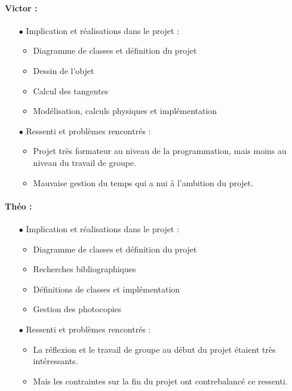 \paragraph{Victor :}
\begin{itemize}
\item[$\bullet$]  Implication et réalisations dans le projet :
\begin{itemize}
\item Diagramme de classes et définition du projet
\item Dessin de l'objet
\item Calcul des tangentes
\item Modélisation, calculs physiques et implémentation
\end{itemize}
\item[$\bullet$] Ressenti et problèmes rencontrés :
\begin{itemize}
\item Projet très formateur au niveau de la programmation, mais moins au niveau du travail de groupe.
\item Mauvaise gestion du temps qui a nui à l'ambition du projet.
\end{itemize}
\end{itemize}


\paragraph{Théo :}
\begin{itemize}
\item[$\bullet$]  Implication et réalisations dans le projet :
\begin{itemize}
\item Diagramme de classes et définition du projet
\item Recherches bibliographiques
\item Définitions de classes et implémentation
\item Gestion des photocopies
\end{itemize}
\item[$\bullet$] Ressenti et problèmes rencontrés :
\begin{itemize}
\item La réflexion et le travail de groupe au début du projet étaient très intéressants.
\item Mais les contraintes sur la fin du projet ont contrebalancé ce ressenti.
\end{itemize}
\end{itemize}

